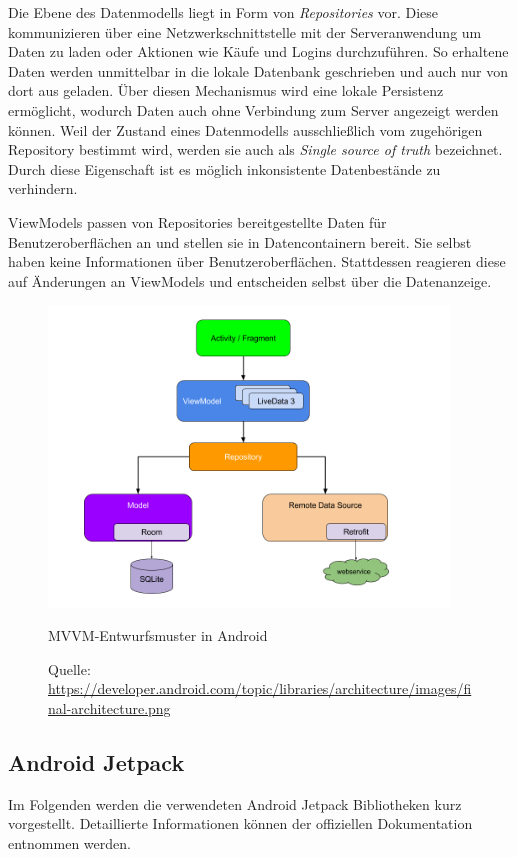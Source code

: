 \documentclass[a4paper, 11pt]{article}
\begin{document}
Die Ebene des Datenmodells liegt in Form von \textit{Repositories} vor.
Diese kommunizieren über eine Netzwerkschnittstelle mit der Serveranwendung um Daten zu laden oder Aktionen wie Käufe und Logins durchzuführen.
So erhaltene Daten werden unmittelbar in die lokale Datenbank geschrieben und auch nur von dort aus geladen.
Über diesen Mechanismus wird eine lokale Persistenz ermöglicht, wodurch Daten auch ohne Verbindung zum Server angezeigt werden können.
Weil der Zustand eines Datenmodells ausschließlich vom zugehörigen Repository bestimmt wird, werden sie auch als \textit{Single source of truth} bezeichnet.
Durch diese Eigenschaft ist es möglich inkonsistente Datenbestände zu verhindern.

ViewModels passen von Repositories bereitgestellte Daten für Benutzeroberflächen an und stellen sie in Datencontainern bereit.
Sie selbst haben keine Informationen über Benutzeroberflächen.
Stattdessen reagieren diese auf Änderungen an ViewModels und entscheiden selbst über die Datenanzeige.

\begin{figure}[]
	\centering
	\includegraphics[height=8cm,keepaspectratio]{./images/android-architecture.png}
	\caption{MVVM-Entwurfsmuster in Android}
	\caption*{\small Quelle: \url{https://developer.android.com/topic/libraries/architecture/images/final-architecture.png}}
	\label{fig:app:architecture:mvvm}
\end{figure}

\subsection{Android Jetpack}
\label{subsec:app:jetpack}
Im Folgenden werden die verwendeten Android Jetpack Bibliotheken kurz vorgestellt. Detaillierte Informationen können der offiziellen Dokumentation entnommen werden.
\end{document}

